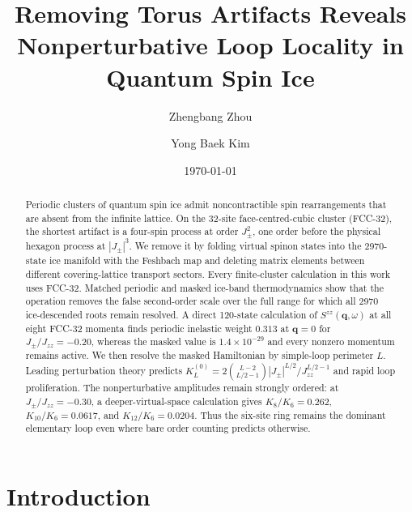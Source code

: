 \documentclass[aps,prb,twocolumn,amsmath,amssymb,superscriptaddress,
longbibliography,floatfix]{revtex4-2}
\newcommand{\Jzz}{J_{zz}}
\newcommand{\Jpm}{J_{\pm}}
\newcommand{\bq}{\bm q}
\begin{document}
\title{Removing Torus Artifacts Reveals Nonperturbative Loop Locality in
Quantum Spin Ice}

\author{Zhengbang Zhou}

\author{Yong Baek Kim}

\date{\today}

\begin{abstract}
Periodic clusters of quantum spin ice admit noncontractible spin
rearrangements that are absent from the infinite lattice.  On the 32-site
face-centred-cubic cluster (FCC-32), the shortest artifact is a four-spin
process at order $\Jpm^2$, one order before the physical hexagon process at
$|\Jpm|^3$.  We remove it by folding virtual spinon states into the 2970-state
ice manifold with the Feshbach map and deleting matrix elements between
different covering-lattice transport sectors.  Every finite-cluster
calculation in this work uses FCC-32.  Matched periodic and masked ice-band thermodynamics
show that the operation removes the false second-order scale over the full
range for which all 2970 ice-descended roots remain resolved.  A direct
120-state calculation of $S^{zz}(\bq,\omega)$ at all eight FCC-32 momenta
finds periodic inelastic weight $0.313$ at $\bq=0$ for
$\Jpm/\Jzz=-0.20$, whereas the masked value is $1.4\times10^{-29}$ and every
nonzero momentum remains active.  We then resolve the masked Hamiltonian by
simple-loop perimeter $L$.  Leading perturbation theory predicts
$K_L^{(0)}=2\binom{L-2}{L/2-1}|\Jpm|^{L/2}/\Jzz^{L/2-1}$ and rapid loop
proliferation.  The nonperturbative amplitudes remain strongly ordered:
at $\Jpm/\Jzz=-0.30$, a deeper-virtual-space calculation gives
$K_8/K_6=0.262$, $K_{10}/K_6=0.0617$, and $K_{12}/K_6=0.0204$.  Thus the
six-site ring remains the dominant elementary loop even where bare order
counting predicts otherwise.
\end{abstract}

\maketitle

\section{Introduction}
\label{sec:intro}
\end{document}
